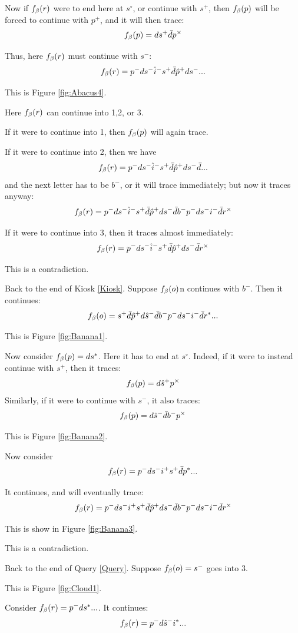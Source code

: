 Now if $f_\beta(r)$ were to end here at $s^\circ$, or continue with $s^+$, then $f_\beta(p)$ will be forced to continue with $p^+$, and it will then trace:
\[
f_\beta(p) = d s^+ \bar{d} p^\times
\]

Thus, here $f_\beta(r)$ must continue with $s^-$:
\[
f_\beta(r) = p^- d s^- \hat{i}^- s^+ \bar{d} \hat{p}^+ d s^-...
\]

This is Figure \ref{fig:Abacus4}. 

Here $f_\beta(r)$ can continue into 1,2, or 3.

If it were to continue into 1, then $f_\beta(p)$ will again trace. 

If it were to continue into 2, then we have
\[
f_\beta(r) = p^- d s^- \hat{i}^- s^+ \bar{d} \hat{p}^+ d s^- \bar{d}...
\]
and the next letter has to be $b^-$, or it will trace immediately; but now it traces anyway:
\[
f_\beta(r) = p^- d s^- \hat{i}^- s^+ \bar{d} \hat{p}^+ d s^- \bar{d} b^- p^- d s^- i^- \bar{d} r^\times
\]

If it were to continue into 3, then it traces almost immediately:
\[
f_\beta(r) = p^- d s^- \hat{i}^- s^+ \bar{d} \hat{p}^+ d s^- \bar{d} r^\times
\]

This is a contradiction.

\label{Banana}
Back to the end of Kiosk \ref{Kiosk}. Suppose $f_\beta(o)$n continues with $b^-$. Then it continues:
\[
f_\beta(o) = s^+ \bar{d} \hat{p}^+ d \hat{s}^- \bar{d} b^- p^- d s^- i^- \bar{d} r^*...
\]

This is Figure \ref{fig:Banana1}.

Now consider $f_\beta(p) = d s^*$. Here it has to end at $s^\circ$. Indeed, if it were to instead continue with $s^+$, then it traces:
\[
f_\beta(p) = d \hat{s}^+ p^\times
\]
Similarly, if it were to continue with $s^-$, it also traces:
\[
f_\beta(p) = d \hat{s}^- \bar{d} b^- p^\times
\]

This is Figure \ref{fig:Banana2}. 

Now consider 
\[
f_\beta(r) = p^- d s^- i^+ s^+ \bar{d} p^*...
\]

It continues, and will eventually trace:
\[
f_\beta(r) = p^- d s^- i^+ s^+ \bar{d} \hat{p}^+ d s^- \bar{d} b^- p^- d s^- i^- \bar{d} r^\times
\]

This is show in Figure \ref{fig:Banana3}.

This is a contradiction.

\label{Cloud}
Back to the end of Query \ref{Query}. Suppose $f_\beta(o) = s^-$ goes into 3. 

This is Figure \ref{fig:Cloud1}.

Consider $f_\beta(r) = p^- d s^*...$. It continues:
\[
f_\beta(r) = p^- d \hat{s}^- i^*...
\]

